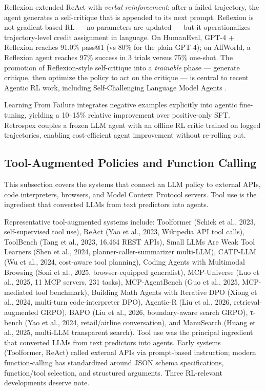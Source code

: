 \documentclass{article}
\begin{document}
Reflexion \citep{shinn20232023} extended ReAct with \emph{verbal reinforcement}: after a failed trajectory, the agent generates a self-critique that is appended to its next prompt. Reflexion is not gradient-based RL --- no parameters are updated --- but it operationalizes trajectory-level credit assignment in language. On HumanEval, GPT-4 + Reflexion reaches 91.0\% pass@1 (vs 80\% for the plain GPT-4); on AlfWorld, a Reflexion agent reaches 97\% success in 3 trials versus 75\% one-shot. The promotion of Reflexion-style self-critique into a \emph{trainable} phase --- generate critique, then optimize the policy to act on the critique --- is central to recent Agentic RL work, including Self-Challenging Language Model Agents \citep{zhou20252025}.

Learning From Failure \citep{wang20242024} integrates negative examples explicitly into agentic fine-tuning, yielding a 10--15\% relative improvement over positive-only SFT. Retrospex \citep{xiang20252025} couples a frozen LLM agent with an offline RL critic trained on logged trajectories, enabling cost-efficient agent improvement without re-rolling out.

\subsection{Tool-Augmented Policies and Function Calling}\label{tool-augmented-policies-and-function-calling}

This subsection covers the systems that connect an LLM policy to external APIs, code interpreters, browsers, and Model Context Protocol servers. Tool use is the ingredient that converted LLMs from text predictors into agents.

Representative tool-augmented systems include: Toolformer (Schick et al., 2023, self-supervised tool use), ReAct (Yao et al., 2023, Wikipedia API tool calls), ToolBench (Tang et al., 2023, 16,464 REST APIs), Small LLMs Are Weak Tool Learners (Shen et al., 2024, planner-caller-summarizer multi-LLM), CATP-LLM (Wu et al., 2024, cost-aware tool planning), Coding Agents with Multimodal Browsing (Soni et al., 2025, browser-equipped generalist), MCP-Universe (Luo et al., 2025, 11 MCP servers, 231 tasks), MCP-AgentBench (Guo et al., 2025, MCP-mediated tool benchmark), Building Math Agents with Iterative DPO (Xiong et al., 2024, multi-turn code-interpreter DPO), Agentic-R (Liu et al., 2026, retrieval-augmented GRPO), BAPO (Liu et al., 2026, boundary-aware search GRPO), τ-bench (Yao et al., 2024, retail/airline conversation), and ManuSearch (Huang et al., 2025, multi-LLM transparent search). Tool use was the principal ingredient that converted LLMs from text predictors into agents. Early systems (Toolformer, ReAct) called external APIs via prompt-based instruction; modern function-calling has standardized around JSON schema specifications, function/tool selection, and structured arguments. Three RL-relevant developments deserve note.
\end{document}
